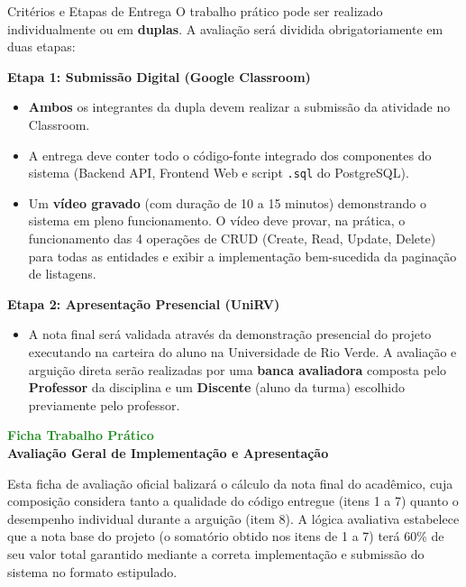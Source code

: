 \documentclass[12pt,a4paper]{article}
\begin{document}
\vspace{0.4cm}
\begin{blockbox}{Critérios e Etapas de Entrega}
O trabalho prático pode ser realizado individualmente ou em \textbf{duplas}. A avaliação será dividida obrigatoriamente em duas etapas:

\textbf{Etapa 1: Submissão Digital (Google Classroom)}
\begin{itemize}[leftmargin=*, noitemsep]
    \item \textbf{Ambos} os integrantes da dupla devem realizar a submissão da atividade no Classroom.
    \item A entrega deve conter todo o código-fonte integrado dos componentes do sistema (Backend API, Frontend Web e script \texttt{.sql} do PostgreSQL).
    \item Um \textbf{vídeo gravado} (com duração de 10 a 15 minutos) demonstrando o sistema em pleno funcionamento. O vídeo deve provar, na prática, o funcionamento das 4 operações de CRUD (Create, Read, Update, Delete) para todas as entidades e exibir a implementação bem-sucedida da paginação de listagens.
\end{itemize}

\textbf{Etapa 2: Apresentação Presencial (UniRV)}
\begin{itemize}[leftmargin=*, noitemsep]
    \item A nota final será validada através da demonstração presencial do projeto executando na carteira do aluno na Universidade de Rio Verde. A avaliação e arguição direta serão realizadas por uma \textbf{banca avaliadora} composta pelo \textbf{Professor} da disciplina e um \textbf{Discente} (aluno da turma) escolhido previamente pelo professor.
\end{itemize}
\end{blockbox}

\newpage
\begin{center}
    {\huge \textbf{\textcolor{forestgreen}{Ficha Trabalho Prático}}} \\[0.3cm]
    {\large \textbf{Avaliação Geral de Implementação e Apresentação}} \\[0.8cm]
\end{center}

Esta ficha de avaliação oficial balizará o cálculo da nota final do acadêmico, cuja composição considera tanto a qualidade do código entregue (itens 1 a 7) quanto o desempenho individual durante a arguição (item 8). A lógica avaliativa estabelece que a nota base do projeto (o somatório obtido nos itens de 1 a 7) terá 60\% de seu valor total garantido mediante a correta implementação e submissão do sistema no formato estipulado.
\end{document}

